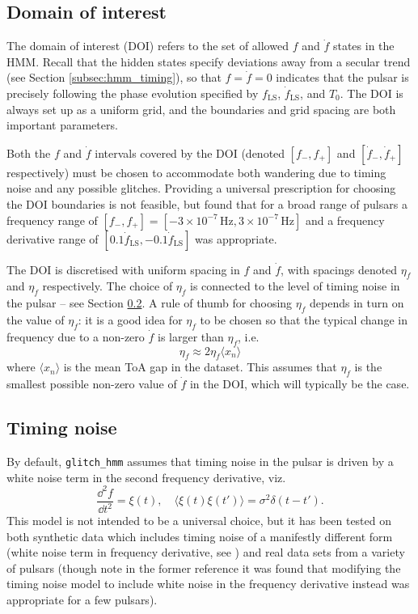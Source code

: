 \documentclass{article}
\newcommand{\glitchhmm}{\texttt{glitch\_hmm}}
\begin{document}
\subsection{Domain of interest}
\label{subsec:doi}
The domain of interest (DOI) refers to the set of allowed $f$ and $\dot{f}$ states in the HMM.
Recall that the hidden states specify deviations away from a secular trend (see Section \ref{subsec:hmm_timing}), so that $f = \dot{f} = 0$ indicates that the pulsar is precisely following the phase evolution specified by $f_\text{LS}$, $\dot{f}_\text{LS}$, and $T_0$.
The DOI is always set up as a uniform grid, and the boundaries and grid spacing are both important parameters.

Both the $f$ and $\dot{f}$ intervals covered by the DOI (denoted $[f_-, f_+]$ and $[\dot{f}_-, \dot{f}_+]$ respectively) must be chosen to accommodate both wandering due to timing noise and any possible glitches.
Providing a universal prescription for choosing the DOI boundaries is not feasible, but \citet{Dunn2021} found that for a broad range of pulsars a frequency range of $[f_-, f_+] = [-3 \times 10^{-7}\,\mathrm{Hz}, 3 \times 10^{-7}\,\mathrm{Hz}]$ and a frequency derivative range of $[0.1\dot{f}_\text{LS}, -0.1\dot{f}_\text{LS}]$ was appropriate.

The DOI is discretised with uniform spacing in $f$ and $\dot{f}$, with spacings denoted $\eta_f$ and $\eta_{\dot{f}}$ respectively.
The choice of $\eta_{\dot{f}}$ is connected to the level of timing noise in the pulsar -- see Section \ref{subsec:tn}.
A rule of thumb for choosing $\eta_f$ depends in turn on the value of $\eta_{\dot{f}}$: it is a good idea for $\eta_f$ to be chosen so that the typical change in frequency due to a non-zero $\dot{f}$ is larger than $\eta_f$, i.e. \begin{equation} \eta_f \approx 2\eta_{\dot{f}}\langle x_n \rangle \end{equation} where $\langle x_n \rangle$ is the mean ToA gap in the dataset.
This assumes that $\eta_{\dot{f}}$ is the smallest possible non-zero value of $\dot{f}$ in the DOI, which will typically be the case.
\subsection{Timing noise}
\label{subsec:tn}
By default, \glitchhmm{} assumes that timing noise in the pulsar is driven by a white noise term in the second frequency derivative, viz. \begin{equation} \frac{\dd^2f}{\dd t^2} = \xi(t),\quad \langle\xi(t)\xi(t')\rangle = \sigma^2\delta(t-t').\label{eqn:tn}\end{equation}
This model is not intended to be a universal choice, but it has been tested on both synthetic data which includes timing noise of a manifestly different form (white noise term in frequency derivative, see \citealt{MelatosDunn2020}) and real data sets from a variety of pulsars \citep{Lower2021, DunnMelatos2022} (though note in the former reference it was found that modifying the timing noise model to include white noise in the frequency derivative instead was appropriate for a few pulsars).
\end{document}
